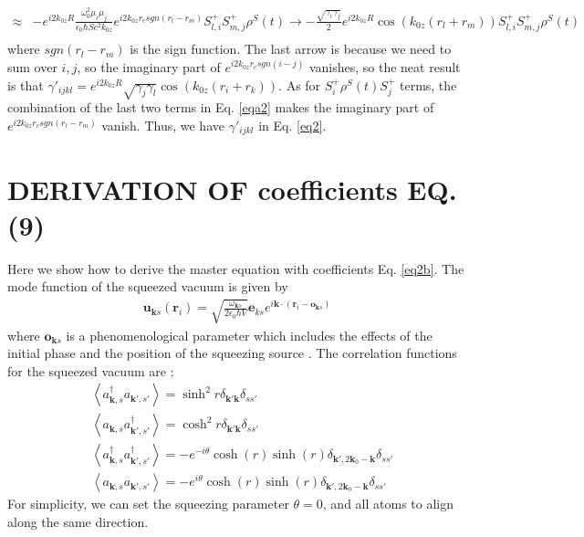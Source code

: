 \documentclass[aps,showpacs,twocolumn,twoside,groupedaddress]{revtex4}
\let\vec\bm
\begin{document}
\begin{widetext}
\begin{equation}
\begin{split}
\approx&-e^{i2k_{0z}R}\frac{\omega_{0}^{2}\mu_{i}\mu_{j}}{\epsilon_{0}\hbar Sc^{2}k_{0z}}e^{i2k_{0z}r_{c}sgn(r_{l}-r_{m})}S_{l,i}^{+}S_{m,j}^{+}\rho^{S}(t)\rightarrow-\frac{\sqrt{\gamma_{i}\gamma_{j}}}{2}e^{i2k_{0z}R}\cos(k_{0z}(r_{l}+r_{m}))S_{l,i}^{+}S_{m,j}^{+}\rho^{S}(t)\\
\end{split}
\end{equation}
where $sgn(r_{l}-r_{m})$ is the sign function. The last arrow is because we need to sum over $i,j$, so the imaginary part of $e^{i2k_{0z}r_{c}sgn(i-j)}$ vanishes, so the neat result is that $\gamma'_{ijkl}=e^{i2k_{0z}R}\sqrt{\gamma_{j}\gamma_{l}}\cos(k_{0z}(r_{i}+r_{k}))$. As for $S_{i}^{+}\rho^{S}(t)S_{j}^{+}$ terms, the combination of the last two terms in Eq. \eqref{eqa2} makes the imaginary part of $e^{i2k_{0z}r_{c}sgn(r_{l}-r_{m})}$ vanish. Thus, we have $\gamma'_{ijkl}$ in Eq. \eqref{eq2}. 

\section{DERIVATION OF coefficients EQ. (9) }
Here we show how to derive the master equation with coefficients Eq. \eqref{eq2b}. The mode function of the squeezed vacuum is given by
\begin{equation}
  \label{eq2b}
  \begin{gathered}
\vec{u}_{\vec{k}s}(\vec{r}_{i})=\sqrt{\frac{\omega_{\vec{k}s}}{2\epsilon_{0}\hbar V}}\vec{e}_{ks}e^{i\vec{k}\cdot(\vec{r}_{i}-\vec{o}_{\vec{k}s})}
 \end{gathered}
\end{equation}
where $\vec{o}_{\vec{k}s} $ is a phenomenological parameter which includes the effects of the initial phase and the position of the squeezing source \cite{You2018}. The correlation functions for the squeezed vacuum are \cite{scully1999quantum}:
\begin{equation}
\label{eq0a}
\begin{split}
& \left\langle a_{\vec{k},s}^{\dagger}a_{\vec{k}',s'}\right\rangle =\sinh^{2}r\delta_{\vec{k}'\vec{k}}\delta_{ss'} \\
& \left\langle a_{\vec{k},s}a_{\vec{k}',s'}^{\dagger}\right\rangle =\cosh^{2}r\delta_{\vec{k}'\vec{k}}\delta_{ss'}\\
& \left\langle a_{\vec{k},s}^{\dagger}a_{\vec{k}',s'}^{\dagger}\right\rangle =-e^{-i\theta}\cosh(r)\sinh(r)\delta_{\vec{k}',2\vec{k}_{0}-\vec{k}}\delta_{ss'}\\
&\left\langle a_{\vec{k},s}a_{\vec{k}',s'}\right\rangle =-e^{i\theta}\cosh(r)\sinh(r)\delta_{\vec{k}',2\vec{k}_{0}-\vec{k}}\delta_{ss'}
\end{split}
\end{equation}
For simplicity, we can set the squeezing parameter $\theta=0$, and all atoms to align along the same direction.


\end{widetext}
\end{document}
